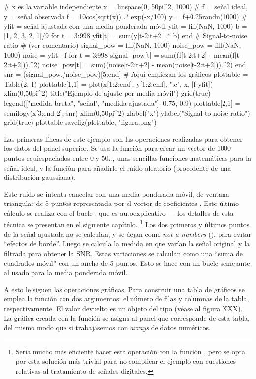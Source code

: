 ﻿\documentclass[spanish]{article}
\begin{document}
# x es la variable independiente
x = linspace(0, 50pi^2, 1000)
# f = señal ideal, y = señal observada
f = 10cos(sqrt(x)) .* exp(-x/100)
y = f+0.25randn(1000)
# yfit = señal ajustada con una media ponderada móvil
yfit = fill(NaN, 1000)
b = [1, 2, 3, 2, 1]/9
for t = 3:998
  yfit[t] = sum(y[t-2:t+2] .* b)
end
# Signal-to-noise ratio
# (ver comentario)
signal_pow = fill(NaN, 1000)
noise_pow = fill(NaN, 1000)
noise = yfit - f
for t = 3:998
  signal_pow[t] = sum((f[t-2:t+2] - mean(f[t-2:t+2])).^2)
  noise_pow[t] = sum((noise[t-2:t+2] - mean(noise[t-2:t+2])).^2)
end
snr = (signal_pow./noise_pow)[5:end]
# Aquí empiezan los gráficos
plottable = Table(2, 1)
plottable[1,1] = plot(x[1:2:end], y[1:2:end], ".c", x, [f yfit])
xlim(0,50pi^2)
title("Ejemplo de ajuste por media móvil")
grid(true)
legend(["medida bruta", "señal", "medida ajustada"], 0.75, 0.9)
plottable[2,1] = semilogy(x[3:end-2], snr)
xlim(0,50pi^2)
xlabel("x")
ylabel("Signal-to-noise-ratio")
grid(true)
plottable
savefig(plottable, "figura.png")

Las primeras líneas de este ejemplo son las operaciones realizadas para obtener los datos del panel superior. Se usa la función  para crear un vector de 1000 puntos equiespaciados entre $0$ y $50\pi$, unas sencillas funciones matemáticas para la señal ideal, y la función  para añadirle el ruido aleatorio (procedente de una distribución gaussiana).

Este ruido se intenta cancelar con una media ponderada móvil, de ventana triangular de 5 puntos representada por el vector de coeficientes . Este último cálculo se realiza con el bucle , que es autoexplicativo --- los detalles de esta técnica se presentan en  el siguiente capítulo.%
\footnote{%
Sería mucho más eficiente hacer esta operación con la
función , pero se opta por esta solución más trivial para no
complicar el ejemplo con cuestiones relativas al tratamiento de señales digitales.%
}
Los dos primeros y últimos puntos de la señal ajustada no se calculan, y se dejan como \emph{not-a-numbers} (), para evitar ``efectos de borde''. Luego se calcula la medida en que varían la señal original y la filtrada para obtener la SNR. Estas variaciones se calculan como una ``suma de cuadrados móvil'' con un ancho de 5 puntos. Esto se hace con un bucle semejante al usado para la media ponderada móvil.

A esto le siguen las operaciones gráficas. Para construir una tabla de gráficos se emplea la función  con dos argumentos: el número de filas y columnas de la tabla, respectivamente. El valor devuelto es un objeto del tipo  (véase al figura XXX). La gráfica creada con la función  se asigna al panel que corresponde de esta tabla, del mismo modo que si trabajásemos con \emph{arrays} de datos numéricos.
\end{document}

